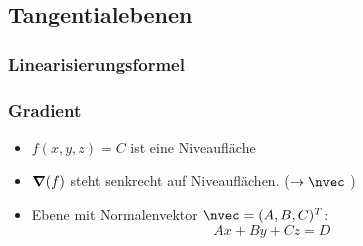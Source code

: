 \subsection{Tangentialebenen}
    \subsubsection{Linearisierungsformel}
        \vspace{0.5em}
    \subsubsection{Gradient}
        \begin{itemize}
            \item $f(x,y,z) = C$ ist eine Niveaufläche
            \item $\grad(f)$ steht senkrecht auf Niveauflächen. ($\to \nvec$ )
            \item Ebene mit Normalenvektor $\nvec = (A,B,C)^T$:
            $$
                Ax + By + Cz = D
            $$
        \end{itemize}
